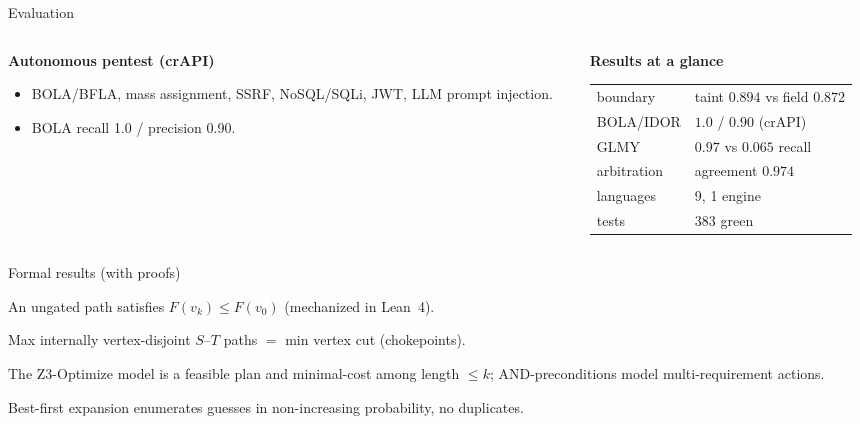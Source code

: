 \documentclass[aspectratio=169,10pt]{beamer}
\begin{document}
\begin{frame}{Evaluation}
  \begin{columns}[T]
    \begin{column}{0.5\textwidth}
      \textbf{Autonomous pentest (crAPI)}\\[2mm]
      \begin{itemize}\scriptsize
        \item BOLA/BFLA, mass assignment, SSRF, NoSQL/SQLi, JWT, LLM prompt injection.
        \item BOLA recall 1.0 / precision 0.90.
      \end{itemize}
    \end{column}
    \begin{column}{0.5\textwidth}
      \textbf{Results at a glance}\\[1mm]
      {\scriptsize
      \begin{tabular}{@{}ll@{}}
        \toprule
        boundary & taint $0.894$ vs field $0.872$ \\
        BOLA/IDOR & $1.0$ / $0.90$ (crAPI) \\
        GLMY & $0.97$ vs $0.065$ recall \\
        arbitration & agreement $0.974$ \\
        languages & 9, 1 engine \\
        tests & 383 green \\
        \bottomrule
      \end{tabular}}
    \end{column}
  \end{columns}
\end{frame}

\begin{frame}{Formal results (with proofs)}
  \begin{theorem}\small
    An ungated path satisfies $F(v_k)\le F(v_0)$ (mechanized in Lean~4).
  \end{theorem}
  \begin{theorem}\small
    Max internally vertex-disjoint $S$--$T$ paths $=$ min vertex cut (chokepoints).
  \end{theorem}
  \begin{theorem}\small
    The Z3-Optimize model is a feasible plan and minimal-cost among length $\le k$;
    AND-preconditions model multi-requirement actions.
  \end{theorem}
  \begin{theorem}\small
    Best-first expansion enumerates guesses in non-increasing probability, no
    duplicates.
  \end{theorem}
\end{frame}
\end{document}
